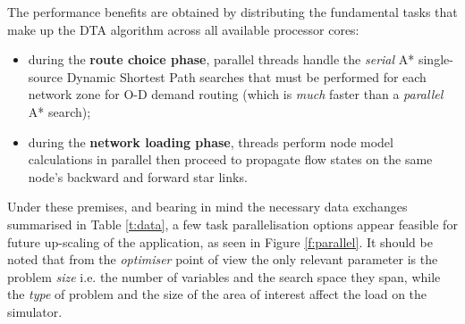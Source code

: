 The performance benefits are obtained by distributing the fundamental tasks that make up the DTA algorithm across all available processor cores: 
\begin{itemize}
\item during the \textbf{route choice phase}, parallel threads handle the \emph{serial} A* single-source Dynamic Shortest Path searches that must be performed for each network zone for O-D demand routing (which is \emph{much} faster than a \emph{parallel} A* search);
\item during the \textbf{network loading phase}, threads perform node model calculations in parallel then proceed to propagate flow states on the same node's backward and forward star links.
\end{itemize}

Under these premises, and bearing in mind the necessary data exchanges summarised in Table \ref{t:data}, a few task parallelisation options appear feasible for future up-scaling of the application, as seen in Figure \ref{f:parallel}. It should be noted that from the \emph{optimiser} point of view the only relevant parameter is the problem \emph{size} i.e. the number of variables and the search space they span, while the \emph{type} of problem and the size of the area of interest affect the load on the simulator.


